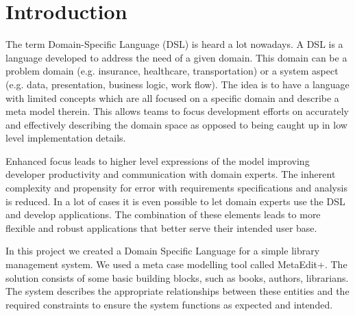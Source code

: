 \section{Introduction}
The term Domain-Specific Language (DSL) is heard a lot nowadays. A DSL is a language developed to address the need of a given domain. This domain can be a problem domain (e.g. insurance, healthcare, transportation) or a system aspect (e.g. data, presentation, business logic, work flow).
The idea is to have a language with limited concepts which are all focused on a specific domain and describe a meta model therein. 
This allows teams to focus development efforts on accurately and effectively describing the domain space as opposed to being caught up in low level implementation details.\par
Enhanced focus leads to higher level expressions of the model improving developer productivity and communication with domain experts. The inherent complexity and propensity for error with requirements specifications and analysis is reduced.
In a lot of cases it is even possible to let domain experts use the DSL and develop applications. The combination of these elements leads to more flexible and robust applications that better serve their intended user base.

In this project we created a Domain Specific Language for a simple library management system. We used a meta case modelling tool called MetaEdit+.  The solution consists of some basic building blocks, such as books, authors, librarians. The system describes the appropriate relationships between these entities and the required constraints to ensure the system functions as expected and intended.